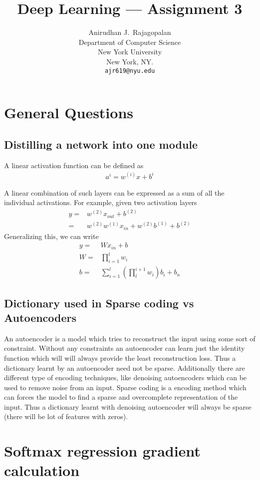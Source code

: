 \documentclass{article}
\title{Deep Learning --- Assignment 3}
\author{Anirudhan J.~Rajagopalan \\
  Department of Computer Science\\
  New York University\\
  New York, NY.\\
  \texttt{ajr619@nyu.edu} \\
}
\begin{document}
\maketitle

\section{General Questions}
\subsection{Distilling a network into one module}
A linear activation function can be defined as 
\begin{align*}
  a^{{i}} = w^{(i)}x + b^{i}
\end{align*}

A linear combination of such layers can be expressed as a sum of all the individual activations.  For example, given two activation layers
\begin{align*}
  y =& w^{(2)}x_{out} + b^{(2)}\\
  =& w^{(2)}w^{(1)}x_{in} + w^{(2)}b^{(1)} + b^{(2)}
\end{align*}
Generalizing this, we can write
\begin{align*}
  y =& Wx_{in} + b \\
  W =& \prod_{i = 1}^{l} w_{i} \\
  b =& \sum_{i = 1}^{l} (\prod_{l}^{i+1} w_{i})b_{i} + b_{n}
\end{align*}

\subsection{Dictionary used in Sparse coding vs Autoencoders}
An autoencoder is a model which tries to reconstruct the input using some sort of constraint.  Without any constraints an autoencoder can learn just the identity function which will will always provide the least reconstruction loss.  Thus a dictionary learnt by an autoencoder need not be sparse.  Additionally there are different type of encoding techniques, like denoising autoencoders which can be used to remove noise from an input.
Sparse coding is a encoding method which can forces the model to find a sparse and overcomplete representation of the input.  
Thus a dictionary learnt with denoising autoencoder will always be sparse (there will be lot of features with zeros).


\section{Softmax regression gradient calculation}
\end{document}
